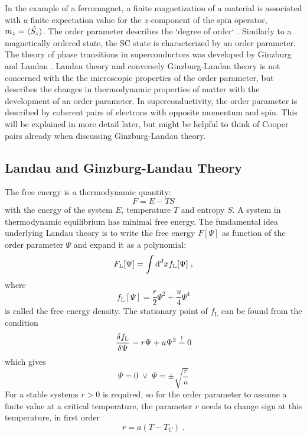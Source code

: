 \documentclass[../notes.tex]{subfiles}
\begin{document}
In the example of a ferromagnet, a finite magnetization of a material is associated with a finite expectation value for the \(z\)-component of the spin operator, \(m_z = \braket{\hat{S_z}}\).
The order parameter describes the `degree of order` \cite{landauTheoryPhaseTransitions1937}.
Similarly to a magnetically ordered state, the SC state is characterized by an order parameter.
The theory of phase transitions in superconductors was developed by Ginzburg and Landau \cite{ginzburgTheorySuperconductivity1950}.
Landau theory and conversely Ginzburg-Landau theory is not concerned with the the microscopic properties of the order parameter, but describes the changes in thermodynamic properties of matter with the development of an order parameter.
In superconductivity, the order parameter is described by coherent pairs of electrons with opposite momentum and spin.
This will be explained in more detail later, but might be helpful to think of Cooper pairs already when discussing Ginzburg-Landau theory.  

\subsection*{Landau and Ginzburg-Landau Theory}\label{sub:Landau and Ginzburg-Landau Theory}

The free energy is a thermodynamic quantity:
\begin{equation}
	F = E - T S
\end{equation}
with the energy of the system \(E\), temperature \(T\) and entropy \(S\).
A system in thermodynamic equilibrium has minimal free energy.
The fundamental idea underlying Landau theory is to write the free energy \(F[\Psi]\) as function of the order parameter \(\Psi\) and expand it as a polynomial:
\begin{equation}
	F_{\mathrm{L}}[\Psi] = \int \odif[order={d}]{x} f_{\mathrm{L}} [\Psi] \;,
\end{equation}
where
\begin{equation}
	f_{\mathrm{L}} [\Psi] = \frac{r}{2} \Psi^2 + \frac{u}{4} \Psi^4
\end{equation}
is called the free energy density.
The stationary point of \(f_{\mathrm{L}}\) can be found from the condition
\begin{equation}
	\fdv{f_{\mathrm{L}}}{\Psi} =  r \Psi + u \Psi^3 \overset{!}{=} 0
\end{equation}
which gives
\begin{equation}
	\Psi = 0 \; \lor \; \Psi = \pm \sqrt{\frac{r}{u}}
\end{equation}
For a stable systems \(r > 0\) is required, so for the order parameter to assume a finite value at a critical temperature, the parameter \(r\) needs to change sign at this temperature, in first order
\begin{equation}
	r = a(T - T_C) \;.
\end{equation}
\end{document}
